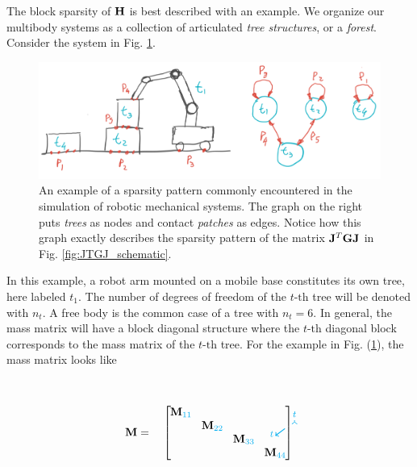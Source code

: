The block sparsity of ${\mathbf{H}}$  is best described with an example. We organize
our multibody systems as a collection of articulated \emph{tree structures}, or
a \emph{forest}. Consider the system in Fig. \ref{fig:sparsity_example}.
\begin{figure}[!h]
	\centering
	\includegraphics[width=0.7\columnwidth]{figures/sparsity_example.png}
	\caption{\label{fig:sparsity_example} 
	An example of a sparsity pattern commonly encountered in the
	simulation of robotic mechanical systems. The graph on the right puts
	\textit{trees} as nodes and contact \textit{patches} as edges. Notice how
	this graph exactly describes the sparsity pattern of the matrix
	${\mathbf{J}}^T{\mathbf{G}}{\mathbf{J}}$ in Fig. \ref{fig:JTGJ_schematic}.}
\end{figure}
In this example, a robot arm mounted on a mobile base constitutes its own tree,
here labeled $t_1$. The number of degrees of freedom of the $t\text{-th}$ tree
will be denoted with $n_t$. A free body is the common case of a tree with
$n_t=6$. In general, the mass matrix will have a
block diagonal structure where the $t\text{-th}$ diagonal block corresponds to
the mass matrix of the $t\text{-th}$ tree. For the example in Fig.
(\ref{fig:sparsity_example}), the mass matrix looks like\\\\\\
\begin{equation}
	\mf{M}=\quad
	\begin{bmatrix}
		\tikzmark{M_topleft}
		\diagentry{\mf{M}_{\cc{11}}}&&&\tikzmark{M_topright}\\
		&\diagentry{\mf{M}_{\cc{22}}}\\
		&&\diagentry{\mf{M}_{\cc{33}}}\\		
		\tikzmark{M_bottomleft}&&&\diagentry{\mf{M}_{\cc{44}}}
	\end{bmatrix}
\tikz[overlay,remember picture] {
	\draw[->,thick,color=cyan]
  ([yshift=3ex]M_topleft) -- ([yshift=3ex]M_topright) node[midway,above]
  {\scriptsize $t$}; 
  \draw[->,thick,color=cyan]
  ([yshift=1.5ex,xshift=-2ex]M_topleft) -- ([xshift=-4ex]M_bottomleft)
  node[near end,left] {\scriptsize $t$};}	
\end{equation}


